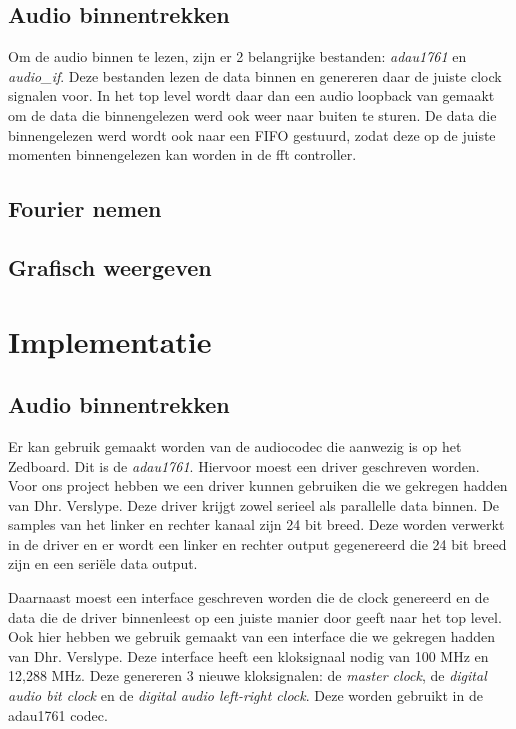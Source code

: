 \documentclass[a4paper,kul]{kulakarticle} %
\begin{document}
\subsection{Audio binnentrekken}

Om de audio binnen te lezen, zijn er 2 belangrijke bestanden: \textit{adau1761} en \textit{audio\_if}. Deze bestanden lezen de data binnen en genereren daar de juiste clock signalen voor. In het top level wordt daar dan een audio loopback van gemaakt om de data die binnengelezen werd ook weer naar buiten te sturen. De data die binnengelezen werd wordt ook naar een FIFO gestuurd, zodat deze op de juiste momenten binnengelezen kan worden in de fft controller.

\subsection{Fourier nemen}

\subsection{Grafisch weergeven}

\section{Implementatie}

\subsection{Audio binnentrekken}

Er kan gebruik gemaakt worden van de audiocodec die aanwezig is op het Zedboard. Dit is de \textit{adau1761}. Hiervoor moest een driver geschreven worden. Voor ons project hebben we een driver kunnen gebruiken die we gekregen hadden van Dhr. Verslype. Deze driver krijgt zowel serieel als parallelle data binnen. De samples van het linker en rechter kanaal zijn 24 bit breed. Deze worden verwerkt in de driver en er wordt een linker en rechter output gegenereerd die 24 bit breed zijn en een seriële data output. \newline

Daarnaast moest een interface geschreven worden die de clock genereerd en de data die de driver binnenleest op een juiste manier door geeft naar het top level. Ook hier hebben we gebruik gemaakt van een interface die we gekregen hadden van Dhr. Verslype. Deze interface heeft een kloksignaal nodig van 100 MHz en 12,288 MHz. Deze genereren 3 nieuwe kloksignalen: de \textit{master clock}, de \textit{digital audio bit clock} en de \textit{digital audio left-right clock}. Deze worden gebruikt in de adau1761 codec. \newline
\end{document}
